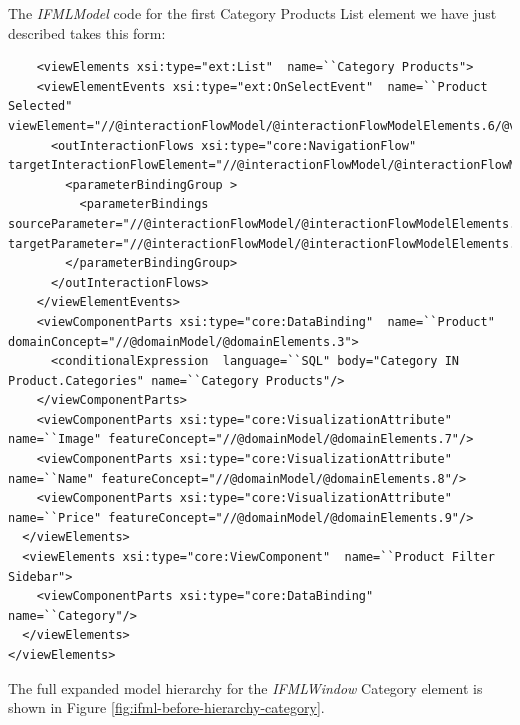 The \textit{IFMLModel} code for the first Category Products List element we have just described takes this form: 
\vspace{0.5cm}
\lstset{language=XML}
\begin{lstlisting} 
    <viewElements xsi:type="ext:List"  name=``Category Products">
    <viewElementEvents xsi:type="ext:OnSelectEvent"  name=``Product Selected" viewElement="//@interactionFlowModel/@interactionFlowModelElements.6/@viewElements.1/@viewElements.0">
      <outInteractionFlows xsi:type="core:NavigationFlow"  targetInteractionFlowElement="//@interactionFlowModel/@interactionFlowModelElements.1">
        <parameterBindingGroup >
          <parameterBindings  sourceParameter="//@interactionFlowModel/@interactionFlowModelElements.1/@parameters.0" targetParameter="//@interactionFlowModel/@interactionFlowModelElements.1/@parameters.0"/>
        </parameterBindingGroup>
      </outInteractionFlows>
    </viewElementEvents>
    <viewComponentParts xsi:type="core:DataBinding"  name=``Product" domainConcept="//@domainModel/@domainElements.3">
      <conditionalExpression  language=``SQL" body="Category IN Product.Categories" name=``Category Products"/>
    </viewComponentParts>
    <viewComponentParts xsi:type="core:VisualizationAttribute"  name=``Image" featureConcept="//@domainModel/@domainElements.7"/>
    <viewComponentParts xsi:type="core:VisualizationAttribute"  name=``Name" featureConcept="//@domainModel/@domainElements.8"/>
    <viewComponentParts xsi:type="core:VisualizationAttribute"  name=``Price" featureConcept="//@domainModel/@domainElements.9"/>
  </viewElements>
  <viewElements xsi:type="core:ViewComponent"  name=``Product Filter Sidebar">
    <viewComponentParts xsi:type="core:DataBinding"  name=``Category"/>
  </viewElements>
</viewElements>
\end{lstlisting}

The full expanded model hierarchy for the \textit{IFMLWindow} Category element is shown in Figure \ref{fig:ifml-before-hierarchy-category}.

